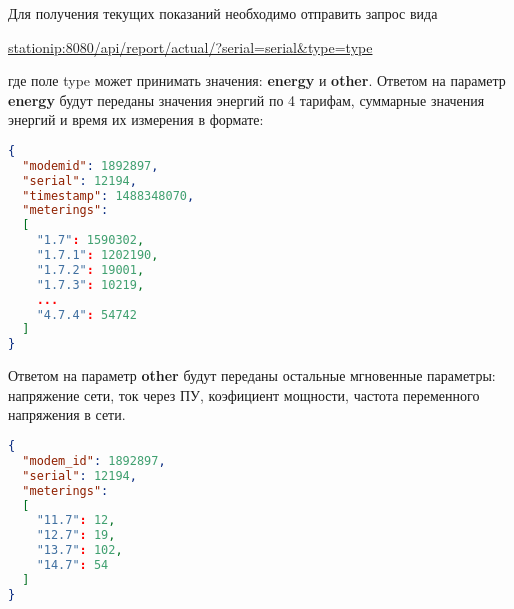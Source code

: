Для получения текущих показаний необходимо отправить запрос вида 
\smallskip

\url{stationip:8080/api/report/actual/?serial=serial&type=type}
\smallskip

где поле type может принимать значения: \textbf{energy} и \textbf{other}. 
Ответом на параметр \textbf{energy} будут переданы значения энергий по 4 тарифам, суммарные значения энергий и время их измерения в формате:

\bigskip

\begin{lstlisting}[language=json,firstnumber=1]
{
  "modemid": 1892897,
  "serial": 12194,
  "timestamp": 1488348070,
  "meterings":
  [
    "1.7": 1590302,
    "1.7.1": 1202190,
    "1.7.2": 19001,
    "1.7.3": 10219,
    ...
    "4.7.4": 54742
  ]
}
\end{lstlisting}

Ответом на параметр \textbf{other} будут переданы остальные мгновенные параметры: напряжение сети, ток через ПУ, коэфициент мощности, частота переменного напряжения в сети.

\bigskip

\begin{lstlisting}[language=json,firstnumber=1]
{
  "modem_id": 1892897,
  "serial": 12194,
  "meterings": 
  [
    "11.7": 12,
    "12.7": 19,
    "13.7": 102,
    "14.7": 54
  ]
}
\end{lstlisting}
